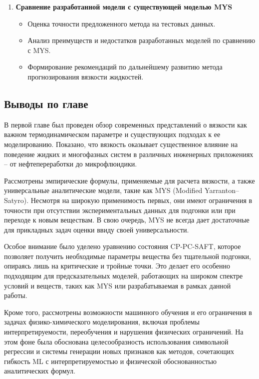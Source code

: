 \documentclass[a4paper,12pt]{article}
\begin{document}
\begin{enumerate}
        \item \textbf{Сравнение разработанной модели с существующей моделью MYS}
        \begin{itemize}
            \item Оценка точности предложенного метода на тестовых данных.
            \item Анализ преимуществ и недостатков разработанных моделей по сравнению с MYS.
            \item Формирование рекомендаций по дальнейшему развитию метода прогнозирования вязкости жидкостей.
        \end{itemize}
    \end{enumerate}
  
  \subsection{Выводы по главе}
В первой главе был проведен обзор современных представлений о вязкости как важном термодинамическом параметре и существующих подходах к ее моделированию. Показано, что вязкость оказывает существенное влияние на поведение жидких и многофазных систем в различных инженерных приложениях -- от нефтепереработки до микрофлюидики.

Рассмотрены эмпирические формулы, применяемые для расчета вязкости, а также универсальные аналитические модели, такие как MYS (Modified Yarranton–Satyro). Несмотря на широкую применимость первых, они имеют ограничения в точности при отсутствии экспериментальных данных для подгонки или при переходе к новым веществам. В свою очередь, MYS не всегда дает достаточные для прикладных задач оценки ввиду своей универсальности.  

Особое внимание было уделено уравнению состояния CP-PC-SAFT, которое позволяет получить необходимые параметры вещества без тщательной подгонки, опираясь лишь на критические и тройные точки. Это делает его особенно подходящим для предсказательных моделей, работающих на широком спектре условий и веществ, таких как MYS или разрабатываемая в рамках данной работы.

Кроме того, рассмотрены возможности машинного обучения и его ограничения в задачах физико-химического моделирования, включая проблемы интерпретируемости, переобучения и нарушения физических ограничений. На этом фоне была обоснована целесообразность использования символьной регрессии и системы генерации новых признаков как методов, сочетающих гибкость ML с интерпретируемостью и физической обоснованностью аналитических формул.
\end{document}
